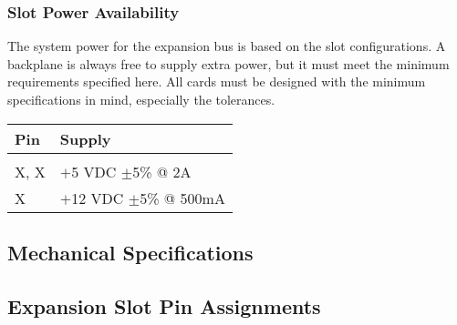 \documentclass{article}
\begin{document}
\subsubsection{Slot Power Availability}

The system power for the expansion bus is based on the slot configurations. A
backplane is always free to supply extra power, but it must meet the minimum
requirements specified here. All cards must be designed with the minimum
specifications in mind, especially the tolerances.

\begin{center}
	\begin{tabularx}{0.75\textwidth}{X X}
		Pin & Supply \\
		\hline \\
		X, X	& $+$5 VDC $\pm$5\% @ 2A \\
		X	& $+$12 VDC $\pm$5\% @ 500mA \\
	\end{tabularx}
\end{center}



\subsection{Mechanical Specifications}

\subsection{Expansion Slot Pin Assignments}
\end{document}

